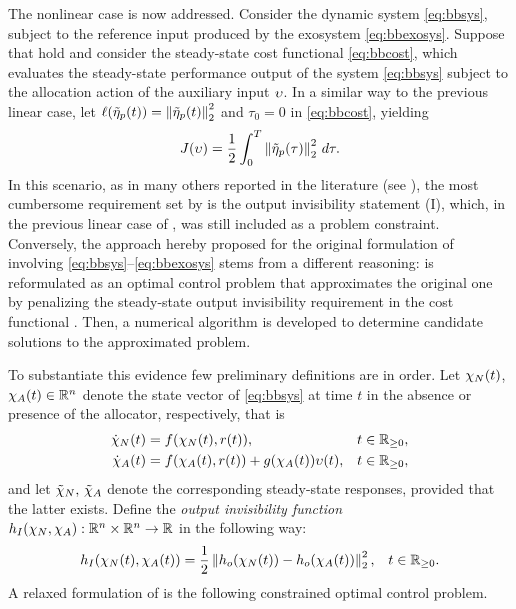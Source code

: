 The nonlinear case is now addressed. Consider the dynamic system \eqref{eq:bbsys}, subject to the reference input produced by the exosystem \eqref{eq:bbexosys}. Suppose that  hold and consider the steady-state cost functional \eqref{eq:bbcost}, which evaluates the steady-state performance output of the system \eqref{eq:bbsys} subject to the allocation action of the auxiliary input $\upsilon$. In a similar way to the previous linear case, let $\ell(\tilde{\eta}_p(t))=\left\Vert\tilde{\eta}_p(t)\right\Vert^2_2$ and $\tau_0=0$ in \eqref{eq:bbcost}, yielding
\begin{equation}
  \label{eq:nlall_sscost}
  J(\upsilon) = \frac{1}{2} \int_0^{T} \left\Vert\tilde{\eta}_p(\tau)\right\Vert^2_2\,d\tau.
\end{equation}
In this scenario, as in many others reported in the literature (see ), the most cumbersome requirement set by  is the output invisibility statement (I), which, in the previous linear case of , was still included as a problem constraint. Conversely, the approach hereby proposed for the original formulation of  involving \eqref{eq:bbsys}--\eqref{eq:bbexosys} stems from a different reasoning:  is reformulated as an optimal control problem that approximates the original one by penalizing the steady-state output invisibility requirement in the cost functional \cite{masocco_dynamic_2024}. Then, a numerical algorithm is developed to determine candidate solutions to the approximated problem.

To substantiate this evidence few preliminary definitions are in order. Let $\chi_N(t)$, $\chi_A(t)\in\mathbb{R}^n$ denote the state vector of \eqref{eq:bbsys} at time $t$ in the absence or presence of the allocator, respectively, that is
\begin{subequations}
  \label{eq:nlall_xnxa}
  \begin{align}
    \dot{\chi}_N(t) & = f(\chi_N(t), r(t)), & t\in\mathbb{R}_{\geq 0},\label{eq:nlall_xn} \\
    \dot{\chi}_A(t) & = f(\chi_A(t), r(t)) + g(\chi_A(t))\upsilon(t), & t\in\mathbb{R}_{\geq 0},\label{eq:nlall_xa}
  \end{align}
\end{subequations}
and let $\tilde{\chi}_{N},\,\tilde{\chi}_{A}$ denote the corresponding steady-state responses, provided that the latter exists. Define the \emph{output invisibility function} $h_I(\chi_N, \chi_A) : \mathbb{R}^n\times\mathbb{R}^n \rightarrow \mathbb{R}$ in the following way:
\begin{align}
  \label{eq:nlall_hi}
  h_I(\chi_N(t), \chi_A(t)) &= \frac{1}{2} \left\Vert h_o(\chi_N(t)) - h_o(\chi_A(t)) \right\Vert_2^2, & t\in\mathbb{R}_{\geq 0}.
\end{align}
A relaxed formulation of  is the following constrained optimal control problem.

